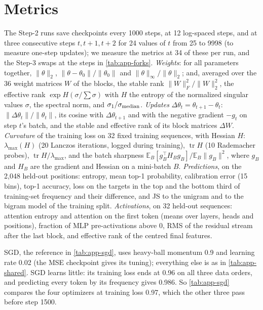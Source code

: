 \section{Metrics}
\label{app:metrics}

The Step-2 runs save checkpoints every 1000 steps, at 12 log-spaced steps, and at three consecutive steps $t,t+1,t+2$
for 24 values of $t$ from 25 to 9998 (to measure one-step updates); we measure the metrics at 34 of these per run, and
the Step-3 swaps at the steps in \cref{tab:app-forks}. \emph{Weights}: for all parameters together, $\|\theta\|_2$,
$\|\theta-\theta_0\|/\|\theta_0\|$ and $\|\theta\|_\infty/\|\theta\|_2$; and, averaged over the 36 weight matrices
$W$ of the blocks, the stable rank $\|W\|_F^2/\|W\|_2^2$, the effective rank $\exp H(\sigma/\textstyle\sum\sigma)$
with $H$ the entropy of the normalized singular values $\sigma$, the spectral norm, and $\sigma_1/\sigma_{\rm median}$.
\emph{Updates} $\Delta\theta_t=\theta_{t+1}-\theta_t$: $\|\Delta\theta_t\|/\|\theta_t\|$, its cosine with
$\Delta\theta_{t+1}$ and with the negative gradient $-g_t$ on step $t$'s batch, and the stable and effective rank of
its block matrices $\Delta W$. \emph{Curvature} of the training loss on 32 fixed training sequences, with Hessian $H$:
$\lambda_{\max}(H)$ (20 Lanczos iterations, logged during training), $\operatorname{tr}H$ (10 Rademacher probes),
$\operatorname{tr}H/\lambda_{\max}$, and the batch sharpness $\mathbb{E}_B[g_B^\top H_Bg_B]/\mathbb{E}_B\|g_B\|^2$,
where $g_B$ and $H_B$ are the gradient and Hessian on a mini-batch $B$.
\emph{Predictions}, on the 2{,}048 held-out
positions: entropy, mean top-1 probability, calibration error (15 bins), top-1 accuracy, loss on the targets in the top
and the bottom third of training-set frequency and their difference, and JS to the unigram and to the bigram model
of the training split. \emph{Activations}, on 32 held-out sequences: attention entropy
and attention on the first token (means over layers, heads and positions), fraction of MLP pre-activations above 0,
RMS of the residual stream after the last block, and effective rank of the centred final features.

SGD, the reference in \cref{tab:app-sgd}, uses heavy-ball momentum 0.9 and learning rate 0.02 (the MSE checkpoint
gives its tuning); everything else is as in \cref{tab:app-shared}. SGD learns little: its training loss ends at 0.96
on all three data orders, and predicting every token by its frequency gives 0.986. So \cref{tab:app-sgd} compares
the four optimizers at training loss 0.97, which the other three pass before step 1500.

